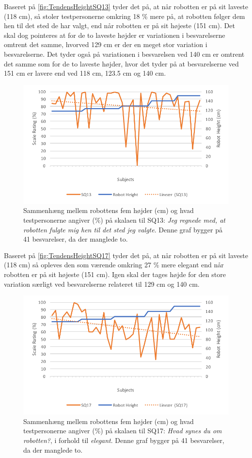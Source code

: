 \noindent
% 
Baseret på \autoref{fig:TendensHeightSQ13} tyder det på, at når robotten er på sit laveste (118 cm), så stoler testpersonerne omkring 18 \% mere på, at robotten følger dem hen til det sted de har valgt, end når robotten er på sit højeste (151 cm). Det skal dog pointeres at for de to laveste højder er variationen i besvarelserne omtrent det samme, hvorved 129 cm er der en meget stor variation i besvarelserne. Det tyder også på variationen i besvarelsen ved 140 cm er omtrent det samme som for de to laveste højder, hvor det tyder på at besvarelserne ved 151 cm er lavere end ved 118 cm, 123.5 cm og 140 cm. 
%
\begin{figure}[H]
\centering
\includegraphics[width=\textwidth]{Figure/DatabehandlingSkalaer/TendensHeight/HeightSQ13}
\caption{Sammenhæng mellem robottens fem højder (cm) og hvad testpersonerne angiver (\%) på skalaen til SQ13: \textit{Jeg regnede med, at robotten fulgte mig hen til det sted jeg valgte}. Denne graf bygger på 41 besvarelser, da der manglede to.}
\label{fig:TendensHeightSQ13}
\end{figure}
\noindent
% 
Baseret på \autoref{fig:TendensHeightSQ17} tyder det på, at når robotten er på sit laveste (118 cm) så opleves den som værende omkring 27 \% mere elegant end når robotten er på sit højeste (151 cm). Igen skal der tages højde for den store variation særligt ved besvarelserne relateret til 129 cm og 140 cm. 
%
\begin{figure}[H]
\centering
\includegraphics[width=\textwidth]{Figure/DatabehandlingSkalaer/TendensHeight/HeightSQ17}
\caption{Sammenhæng mellem robottens fem højder (cm) og hvad testpersonerne angiver (\%) på skalaen til SQ17: \textit{Hvad synes du om robotten?}, i forhold til \textit{elegant}. Denne graf bygger på 41 besvarelser, da der manglede to.}
\label{fig:TendensHeightSQ17}
\end{figure}
